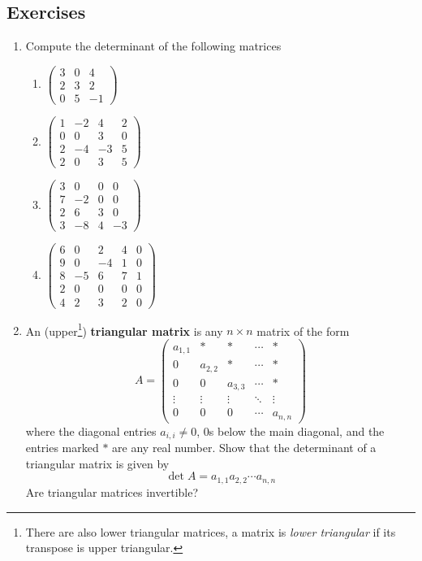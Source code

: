 \documentclass[12pt]{article}
\numberwithin{equation}{subsection}
\numberwithin{figure}{subsection}
\theoremstyle{note}
\begin{document}
\subsection{Exercises}
\begin{enumerate}[label=\arabic*.]

\item Compute the determinant of the following matrices
\begin{enumerate}
	\item $\begin{pmatrix} 3 & 0 & 4 \\ 2 & 3 & 2 \\ 0 & 5 & -1  \end{pmatrix}$
	\item $\begin{pmatrix} 1 & -2 & 4 & 2 \\ 0 & 0 & 3 & 0 \\ 2 & -4 & -3 & 5 \\ 2 & 0 & 3 & 5\end{pmatrix}$
	\item $\begin{pmatrix} 3 & 0 & 0 & 0 \\ 7 & -2 & 0 & 0 \\ 2 & 6 & 3 & 0 \\ 3 & -8 & 4 & -3  \end{pmatrix}$
	\item $\begin{pmatrix} 6 & 0 & 2 & 4 & 0 \\ 9 & 0 & -4 & 1 & 0  \\ 8 & -5 & 6 & 7 & 1 \\ 2 & 0 & 0 & 0 & 0 \\ 4 & 2 & 3 & 2 & 0 \end{pmatrix}$
\end{enumerate}

\item An (upper\footnote{There are also lower triangular matrices, a matrix is \textit{lower triangular} if its transpose is upper triangular.}) \textbf{triangular matrix} is any $n\times n$ matrix of the form \[ A=\begin{pmatrix} a_{1,1} & * & * & \cdots & * \\
0 & a_{2,2} & * & \cdots & * \\
0 & 0 & a_{3,3} & \cdots & * \\
\vdots & \vdots  & \vdots & \ddots & \vdots \\
0 & 0 & 0 & \cdots & a_{n,n} \end{pmatrix}\]
where the diagonal entries $a_{i,i}\neq 0$, 0s below the main diagonal, and the entries marked $*$ are any real number. Show that the determinant of a triangular matrix is given by \[ \det A= a_{1,1} a_{2,2} \cdots a_{n,n}\]
Are triangular matrices invertible? 


\end{enumerate}
\end{document}
